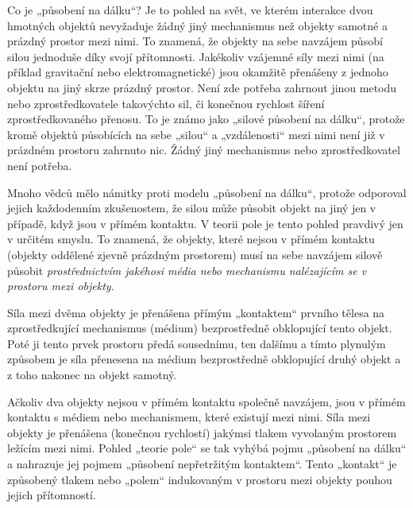     Co je „působení na dálku“? Je to pohled na svět, ve kterém interakce dvou hmotných objektů 
    nevyžaduje žádný jiný mechanismus než objekty samotné a prázdný prostor mezi nimi. To znamená, 
    že objekty na sebe navzájem působí silou jednoduše díky svojí přítomnosti. Jakékoliv vzájemné 
    síly mezi nimi (na příklad gravitační nebo elektromagnetické) jsou okamžitě přenášeny z jednoho 
    objektu na jiný skrze prázdný prostor. Není zde potřeba zahrnout jinou metodu nebo 
    zprostředkovatele takovýchto sil, či konečnou rychlost šíření zprostředkovaného přenosu. To je 
    známo jako „silové působení na dálku“, protože kromě objektů působících na sebe „silou“ a 
    „vzdálenosti“ mezi nimi není již v prázdném prostoru zahrnuto nic. Žádný jiný mechanismus nebo 
    zprostředkovatel není potřeba.
  
    Mnoho vědců mělo námitky proti modelu „působení na dálku“, protože odporoval jejich každodenním 
    zkušenostem, že silou může působit objekt na jiný jen v případě, když jsou v přímém kontaktu. V 
    teorii pole je tento pohled pravdivý jen v určitém smyslu. To znamená, že objekty, které nejsou 
    v přímém kontaktu (objekty oddělené zjevně prázdným prostorem) musí na sebe navzájem silově 
    působit \emph{prostřednictvím jakéhosi média nebo mechanismu nalézajícím se v prostoru mezi 
    objekty}.
  
    Síla mezi dvěma objekty je přenášena přímým „kontaktem“ prvního tělesa na zprostředkující 
    mechanismus (médium) bezprostředně obklopující tento objekt. Poté ji tento prvek prostoru předá 
    sousednímu, ten dalšímu a tímto plynulým způsobem je síla přenesena na médium bezprostředně 
    obklopující druhý objekt a z toho nakonec na objekt samotný.
  
    Ačkoliv dva objekty nejsou v přímém kontaktu společně navzájem, jsou v přímém kontaktu s médiem 
    nebo mechanismem, které existují mezi nimi. Síla mezi objekty je přenášena (konečnou rychlostí) 
    jakýmsi tlakem vyvolaným prostorem ležícím mezi nimi. Pohled „teorie pole“ se tak vyhýbá pojmu 
    „působení na dálku“ a nahrazuje jej pojmem „působení nepřetržitým kontaktem“. Tento „kontakt“ 
    je způsobený tlakem nebo „polem“ indukovaným v prostoru mezi objekty pouhou jejich přítomností.

